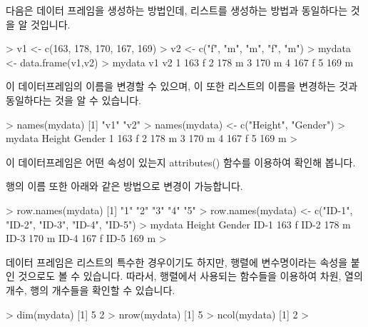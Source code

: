 \documentclass{book}
\begin{document}
다음은 데이터 프레임을 생성하는 방법인데, 리스트를 생성하는 방법과 동일하다는 것을 알 것입니다.
\begin{Schunk}
\begin{Soutput}
> v1 <- c(163, 178, 170, 167, 169)
> v2 <- c("f", "m", "m", "f", "m")
> mydata <- data.frame(v1,v2)
> mydata
   v1 v2
1 163  f
2 178  m
3 170  m
4 167  f
5 169  m
\end{Soutput}
\end{Schunk}

이 데이터프레임의 이름을 변경할 수 있으며, 이 또한 리스트의 이름을 변경하는 것과 동일하다는 것을 알 수 있습니다.

\begin{Schunk}
\begin{Soutput}
> names(mydata)
[1] "v1" "v2"
> names(mydata) <- c("Height", "Gender")
> mydata
  Height Gender
1    163      f
2    178      m
3    170      m
4    167      f
5    169      m
> 	
\end{Soutput}
\end{Schunk}

이 데이터프레임은 어떤 속성이 있는지 attributes() 함수를 이용하여 확인해 봅니다. 
\begin{Schunk}
\end{Schunk}

행의 이름 또한 아래와 같은 방법으로 변경이 가능합니다. 

\begin{Schunk}
\begin{Soutput}
> row.names(mydata)
[1] "1" "2" "3" "4" "5"
> row.names(mydata) <- c("ID-1", "ID-2", "ID-3", "ID-4", "ID-5")
> mydata
     Height Gender
ID-1    163      f
ID-2    178      m
ID-3    170      m
ID-4    167      f
ID-5    169      m
>
\end{Soutput}
\end{Schunk}

데이터 프레임은 리스트의 특수한 경우이기도 하지만, 행렬에 변수명이라는 속성을 붙인 것으로도 볼 수 있습니다.
따라서, 행렬에서 사용되는 함수들을 이용하여 차원, 열의 개수, 행의 개수들을 확인할 수 있습니다.

\begin{Schunk}
\begin{Soutput}
> dim(mydata)
[1] 5 2
> nrow(mydata)
[1] 5
> ncol(mydata)
[1] 2
> 
\end{Soutput}
\end{Schunk}
\end{document}
